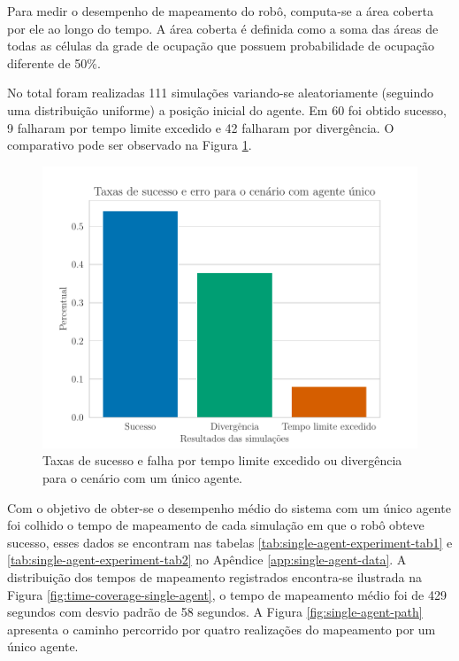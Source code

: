Para medir o desempenho de mapeamento do robô, 
computa-se a área coberta 
por ele ao longo do tempo. A área coberta é definida como a soma das 
áreas de todas as células da grade de ocupação que possuem probabilidade 
de ocupação diferente de 50\%.

No total foram realizadas 111 simulações variando-se aleatoriamente (seguindo uma distribuição uniforme) a posição inicial do agente. Em 60 foi obtido 
sucesso, 9 falharam por tempo limite excedido e 42 falharam por 
divergência. O comparativo pode ser observado na Figura \ref{fig:exp-single-robot-sucess-rate}.
\begin{figure}
  \centering
  \includegraphics[width=.7\textwidth]{figs/success_rate_bar_single_robot.pdf}
  \caption[Taxas de sucesso e falha para simulações com um único agente]{Taxas de sucesso e falha por tempo limite excedido ou divergência para o cenário com um único agente.}
  \label{fig:exp-single-robot-sucess-rate}
\end{figure}

Com o objetivo de obter-se o desempenho médio do sistema com um único 
agente foi colhido o tempo de mapeamento de cada simulação em que o
robô obteve sucesso, esses dados se encontram nas tabelas \ref{tab:single-agent-experiment-tab1} e \ref{tab:single-agent-experiment-tab2} no Apêndice 
\ref{app:single-agent-data}. A distribuição dos tempos de mapeamento 
registrados encontra-se ilustrada na Figura \ref{fig:time-coverage-single-agent}, o tempo de mapeamento médio foi de 
429 segundos com desvio padrão de 58 segundos. A Figura \ref{fig:single-agent-path} apresenta o caminho percorrido por quatro 
realizações do mapeamento por um único agente.

